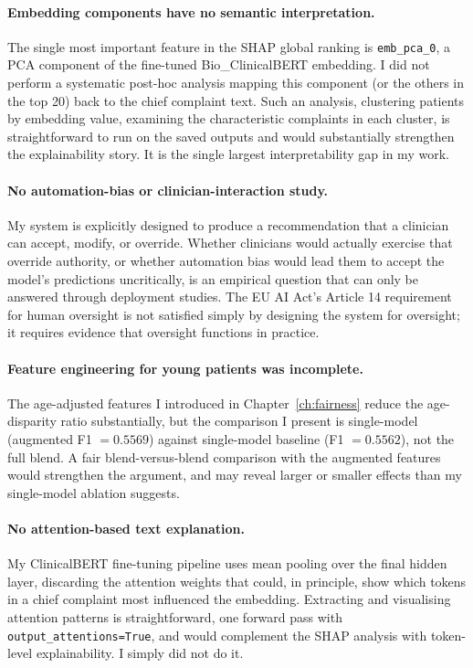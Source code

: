 \paragraph{Embedding components have no semantic interpretation.} The single most important feature in the SHAP global ranking is \texttt{emb\_pca\_0}, a PCA component of the fine-tuned Bio\_ClinicalBERT embedding. I did not perform a systematic post-hoc analysis mapping this component (or the others in the top 20) back to the chief complaint text. Such an analysis, clustering patients by embedding value, examining the characteristic complaints in each cluster, is straightforward to run on the saved outputs and would substantially strengthen the explainability story. It is the single largest interpretability gap in my work.

\paragraph{No automation-bias or clinician-interaction study.} My system is explicitly designed to produce a recommendation that a clinician can accept, modify, or override. Whether clinicians would actually exercise that override authority, or whether automation bias would lead them to accept the model's predictions uncritically, is an empirical question that can only be answered through deployment studies. The EU AI Act's Article 14 requirement for human oversight is not satisfied simply by designing the system for oversight; it requires evidence that oversight functions in practice.

\paragraph{Feature engineering for young patients was incomplete.} The age-adjusted features I introduced in Chapter~\ref{ch:fairness} reduce the age-disparity ratio substantially, but the comparison I present is single-model (augmented F1 $= 0.5569$) against single-model baseline (F1 $= 0.5562$), not the full blend. A fair blend-versus-blend comparison with the augmented features would strengthen the argument, and may reveal larger or smaller effects than my single-model ablation suggests.

\paragraph{No attention-based text explanation.} My ClinicalBERT fine-tuning pipeline uses mean pooling over the final hidden layer, discarding the attention weights that could, in principle, show which tokens in a chief complaint most influenced the embedding. Extracting and visualising attention patterns is straightforward, one forward pass with \texttt{output\_attentions=True}, and would complement the SHAP analysis with token-level explainability. I simply did not do it.

